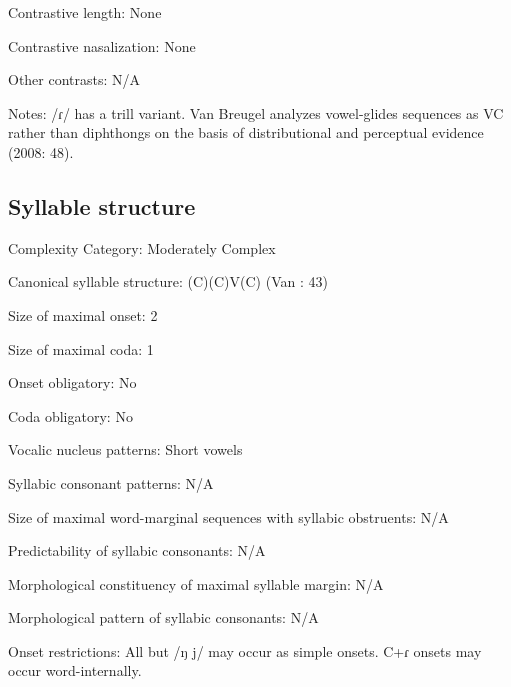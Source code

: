 {\begin{appendixdesc}
\item[Contrastive length:] None

\item[Contrastive nasalization:] None

\item[Other contrasts:] N/A

\item[Notes:] /ɾ/ has a trill variant. Van Breugel analyzes vowel-glides sequences as VC rather than diphthongs on the basis of distributional and perceptual evidence (2008: 48).
\end{appendixdesc}
\subsection*{Syllable structure}
\begin{appendixdesc}

\item[Complexity Category:] Moderately Complex

\item[Canonical syllable structure:] (C)(C)V(C) (Van \citealt{Breugel2008}: 43)

\item[Size of maximal onset:] 2

\item[Size of maximal coda:] 1

\item[Onset obligatory:] No

\item[Coda obligatory:] No

\item[Vocalic nucleus patterns:] Short vowels

\item[Syllabic consonant patterns:] N/A

\item[Size of maximal word-marginal sequences with syllabic obstruents:] N/A

\item[Predictability of syllabic consonants:] N/A

\item[Morphological constituency of maximal syllable margin:] N/A

\item[Morphological pattern of syllabic consonants:] N/A

\item[Onset restrictions:] All but /ŋ j/ may occur as simple onsets. C+ɾ onsets may occur word-internally.


\end{appendixdesc}}
